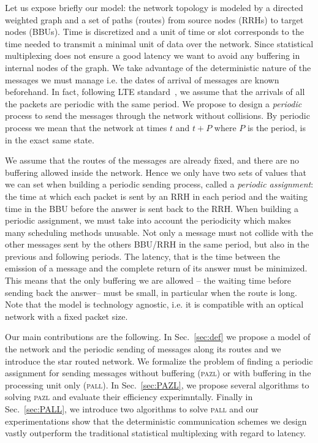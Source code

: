 \documentclass[a4paper,10pt]{IEEEtran}
\newcommand\pazl{\textsc{pazl}\xspace}
\newcommand\pall{\textsc{pall}\xspace}
\begin{document}
Let us expose briefly our model: the network topology is modeled by a directed weighted graph and a set of paths (routes) from source nodes (RRHs) to target nodes (BBUs). Time is discretized and a unit of time or slot corresponds to the time needed to transmit a minimal unit of data over the network. Since statistical multiplexing does not ensure a good latency we want to avoid any  buffering in internal nodes of the graph.  We take advantage of the deterministic nature of the messages we must manage i.e. the dates of arrival of messages are known beforehand. In fact, following LTE standard~\cite{bouguen2012lte}, we assume that the arrivals of all the packets are periodic with the same period. We propose to design a \emph{periodic} process to send the messages through the network without collisions. By periodic process we mean that the network at times $t$ and $t+P$ where $P$ is the period, is in the exact same state. 

We assume that the routes of the messages are already fixed, and there are no buffering allowed inside the network. Hence we only have two sets of values that we can set when building a periodic sending process, called a \emph{periodic assignment}: the time at which each packet is sent by an RRH in each period and the waiting time in the BBU before the answer is sent back to the RRH. When building a periodic assignment, we must take into account the periodicity which makes many scheduling methods unusable. Not only a message must not collide with the other messages sent by the others BBU/RRH in the same period, but also in the previous and following periods. The latency, that is the time between the emission of a message and the complete return of its answer must be minimized. This means that the only buffering we are allowed -- the waiting time before sending back the answer-- must be small, in particular when the route is long. Note that the model is technology agnostic, i.e. it is compatible with an optical network with a fixed packet size.   

Our main contributions are the following.
 In Sec.~\ref{sec:def} we propose a model of the network and the periodic sending of messages along its routes and we introduce the star routed network. We formalize the problem of finding a periodic assignment for sending messages without buffering (\pazl) or with buffering in the processing unit only (\pall). In Sec.~\ref{sec:PAZL}, we propose several algorithms to solving \pazl and evaluate their efficiency experimntally. Finally in Sec.~\ref{sec:PALL}, we introduce two algorithms to solve \pall and our experimentations show that the deterministic communication schemes we design vastly outperform the traditional statistical multiplexing with regard to latency. 
 
\end{document}
